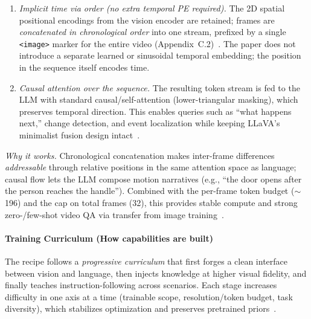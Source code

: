 \begin{enrichment}
\begin{enrichment}
\begin{itemize}
\begin{enumerate}
                \item \emph{Implicit time via order (no extra temporal PE required).} The 2D spatial positional encodings from the vision encoder are retained; frames are \emph{concatenated in chronological order} into one stream, prefixed by a single \texttt{<image>} marker for the entire video (Appendix~C.2)~\cite{li2024_llavaonevision}. The paper does not introduce a separate learned or sinusoidal temporal embedding; the position in the sequence itself encodes time.
                \item \emph{Causal attention over the sequence.} The resulting token stream is fed to the LLM with standard causal/self-attention (lower-triangular masking), which preserves temporal direction. This enables queries such as ``what happens next,'' change detection, and event localization while keeping LLaVA’s minimalist fusion design intact~\cite{li2024_llavaonevision}.
            \end{enumerate}
            \noindent\textit{Why it works.} Chronological concatenation makes inter-frame differences \emph{addressable} through relative positions in the same attention space as language; causal flow lets the LLM compose motion narratives (e.g., “the door opens after the person reaches the handle”). Combined with the per-frame token budget ($\sim$196) and the cap on total frames (32), this provides stable compute and strong zero-/few-shot video QA via transfer from image training~\cite{li2024_llavaonevision}.
        \end{itemize}

        
        \paragraph{Training Curriculum (How capabilities are built)}
        \noindent The recipe follows a \emph{progressive curriculum} that first forges a clean interface between vision and language, then injects knowledge at higher visual fidelity, and finally teaches instruction-following across scenarios. Each stage increases difficulty in one axis at a time (trainable scope, resolution/token budget, task diversity), which stabilizes optimization and preserves pretrained priors~\cite{li2024_llavaonevision}.
        
        \begin{enumerate}
            

\end{enumerate}
\end{enrichment}
\end{enrichment}
